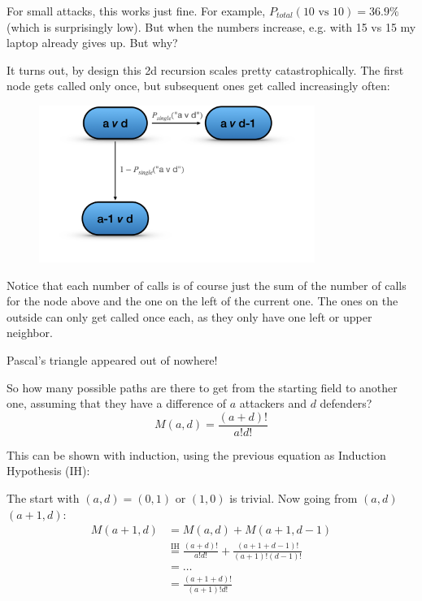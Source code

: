 \documentclass[11pt,a4paper]{article}
\begin{document}
    For small attacks, this works just fine. For example, $P_{total}(\text{10 vs 10}) = 36.9\%$ (which is surprisingly low). But when the numbers increase, e.g. with 15 vs 15 my laptop already gives up. But why?

    It turns out, by design this 2d recursion scales pretty catastrophically.
    The first node gets called only once, but subsequent ones get called increasingly often:

    \begin{figure}[H]
        \centering
        \includegraphics[width=0.8\textwidth]{../images/Basic Recursion.png}
    \end{figure}

    Notice that each number of calls is of course just the sum of the number of calls for the node above and the one on the left of the current one.
    The ones on the outside can only get called once each, as they only have one left or upper neighbor.

    Pascal's triangle appeared out of nowhere!

    So how many possible paths are there to get from the starting field to another one, assuming that they have a difference of $a$ attackers and $d$ defenders?
    \[ M(a, d) = \frac{(a + d)!}{a! d!} \]

    This can be shown with induction, using the previous equation as Induction Hypothesis (IH):

    The start with $(a, d) = (0, 1)$ or $(1, 0)$ is trivial. Now going from $(a, d)$ $(a+1, d)$:
    \[ \begin{aligned}
           M(a+1, d) & = M(a, d) + M(a+1, d-1) \\ & \overset{\mathrm{IH}}{=} \frac{(a + d)!}{a! d!} + \frac{(a+1 + d-1)!}{(a+1)! (d-1)!} \\ & = \ldots \\ & = \frac{(a+1 + d)!}{(a+1)! d!}
    \end{aligned} \]
\end{document}
